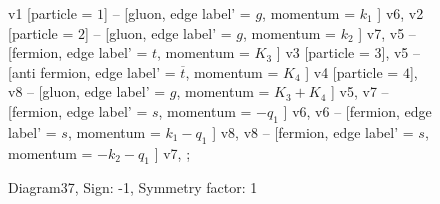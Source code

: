 \documentclass{revtex4}
\begin{document}
\begin{figure}[!htb]
\begin{center}
{    %
v1 [particle = \(1\)] -- [gluon, edge label' = \(g\), momentum = \(k_{1}\) ] v6, 
v2 [particle = \(2\)] -- [gluon, edge label' = \(g\), momentum = \(k_{2}\) ] v7, 
v5 -- [fermion, edge label' = \(t\), momentum = \(K_{3}\) ] v3 [particle = \(3\)], 
v5 -- [anti fermion, edge label' = \(\overline{t}\), momentum = \(K_{4}\) ] v4 [particle = \(4\)], 
v8 -- [gluon, edge label' = \(g\), momentum = \(K_{3} + K_{4}\) ] v5, 
v7 -- [fermion, edge label' = \(s\), momentum = \(-q_{1}\) ] v6, 
v6 -- [fermion, edge label' = \(s\), momentum = \(k_{1} - q_{1}\) ] v8, 
v8 -- [fermion, edge label' = \(s\), momentum = \(-k_{2} - q_{1}\) ] v7, 
};
\end{center}
\caption{Diagram37, Sign: -1, Symmetry factor: 1}
\end{figure}
\newpage
\end{document}
